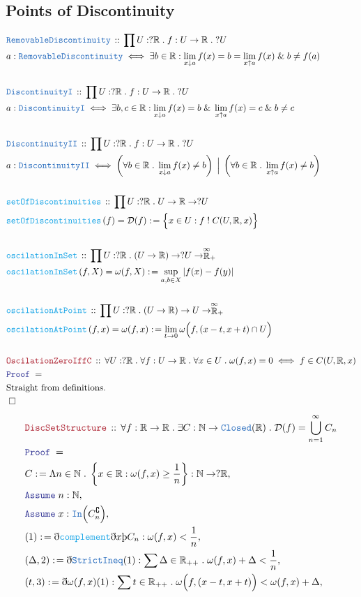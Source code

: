 \documentclass[12pt]{scrartcl}
\newcommand{\TYPE}[1]{\textcolor{NavyBlue}{\mathtt{#1}}}
\newcommand{\FUNC}[1]{\textcolor{Cerulean}{\mathtt{#1}}}
\newcommand{\LOGIC}[1]{\textcolor{Blue}{\mathtt{#1}}}
\newcommand{\THM}[1]{\textcolor{Maroon}{\mathtt{#1}}}
\renewcommand{\.}{\; . \;}
\newcommand{\de}{: \kern 0.1pc =}
\newcommand{\IsNot}{\; ! \;}
\newcommand{\Act}[1]{\left( #1 \right)}
\newcommand{\Theorem}[2]{& \THM{#1} \, :: \, #2 \\ & \Proof = \\ }
\newcommand{\DeclareType}[2]{& \TYPE{#1} \, :: \, #2 \\}
\newcommand{\DefineType}[3]{& #1 : \TYPE{#2} \iff #3 \\}
\newcommand{\DeclareFunc}[2]{& \FUNC{#1} \, :: \, #2 \\}
\newcommand{\DefineNamedFunc}[4]{&  \FUNC{#1}\Act{#2} = #3 \de #4 \\}
\newcommand{\Page}[1]{ \begin{align*} #1 \end{align*}   }
\newcommand{ \bd }{ \ByDef }
\renewcommand{\And}{\; \& \;}
\newcommand{\Reals}{\mathbb{R} }
\newcommand{\Nat}{\mathbb{N} }
\newcommand{\EReals}{\stackrel{\mathclap{\infty}}{\mathbb{R}}}
\renewcommand{\c}{\complement}
\newcommand{\Say}[3]{& #1 \de #2 : #3, \\}
\newcommand{\Assume}[2]{& \LOGIC{Assume} \;#1 : #2, \\}
\newcommand{\QED}{\; \square}
\newcommand{\EndProof}{& \QED \\}
\newcommand{\ByDef}{\eth}
\newcommand{\ByConstr}{\text{\thorn}}
\newcommand{\Proof}{\LOGIC{Proof} \; }
\begin{document}
\subsection{Points of Discontinuity}
\Page{
	\DeclareType{RemovableDiscontinuity}{\prod U : ?\Reals \. f : U \to \Reals \. ?U}
	\DefineType{a}{RemovableDiscontinuity}{\exists b \in \Reals : \lim_{x \downarrow a} f(x) = b = \lim_{x \uparrow a} f(x) 
		\And b \neq f(a)}
	\\
	\DeclareType{DiscontinuityI}{\prod U : ?\Reals \. f : U \to \Reals \. ?U}
	\DefineType{a}{DiscontinuityI}{\exists b,c \in \Reals : \lim_{x \downarrow a} f(x) = b 
		\And \lim_{x \uparrow a} f(x) = c \And b \neq c}
	\\
	\DeclareType{DiscontinuityII}{\prod U : ?\Reals \. f : U \to \Reals \. ?U}
	\DefineType{a}{DiscontinuityII}{ \left( \forall b \in \Reals \. \lim_{x \downarrow a} f(x) \neq b \right) \; \Big| \;  
		 \left( \forall b \in \Reals \. \lim_{x \uparrow a} f(x) \neq b \right) }
	\\ 
	\DeclareFunc{setOfDiscontinuities}{\prod U : ?\Reals \. U \to \Reals \to ?U}
	\DefineNamedFunc{setOfDiscontinuities}{f}{\mathcal{D}(f)}{\Big\{ x \in U : f \IsNot C(U,\Reals,x) \Big\}}
	\\
	\DeclareFunc{oscilationInSet}{\prod U : ?\Reals \. (U \to \Reals) \to ?U \to \EReals_+ }
	\DefineNamedFunc{oscilationInSet}{f,X}{\omega(f,X)}{\sup_{a,b \in X} | f(x) - f(y)|}
	\\
	\DeclareFunc{oscilationAtPoint}{\prod U : ?\Reals \. (U \to \Reals) \to U \to \EReals_+ }
	\DefineNamedFunc{oscilationAtPoint}{f,x}{\omega(f,x)}
	{ \lim_{t \to 0} \omega\Big(f, (x-t,x+t) \cap U \Big)}
	\\
	\Theorem{OscilationZeroIffC}{\forall U : ?\Reals \. \forall f : U \to \Reals \. \forall x \in U \.
		\omega(f,x) = 0 \iff f \in C(U,\Reals,x)
	} 
	& \text{Straight from definitions.}\\
	\EndProof
}\Page{
	\Theorem{DiscSetStructure}{\forall f : \Reals \to \Reals \. \exists C : \Nat \to \TYPE{Closed}(\Reals) \.
		\mathcal{D}(f) = \bigcup^\infty_{n=1} C_n
	}
	\Say{C}{\Lambda n \in \Nat \. \left\{ x \in \Reals : \omega(f,x) \ge \frac{1}{n}  \right\} }
	{   \Nat \to ?\Reals     }
	\Assume{n}{\Nat}
	\Assume{x}{\TYPE{In}\Big(C^\c_n\Big)}
	\Say{(1)}{ \bd \FUNC{complement} \bd x \ByConstr C_n}{ \omega(f,x) < \frac{1}{n}}
	\Say{(\Delta,2)}{\bd \TYPE{StrictIneq}(1)}{\sum \Delta \in \Reals_{++} \. \omega(f,x) + \Delta < \frac{1}{n} }
	\Say{(t,3)}{\bd \omega(f,x)(1)}{\sum t \in \Reals_{++} \. \omega\Big(f, (x -t, x+t) \Big) < \omega(f,x) + \Delta}
}
\end{document}
